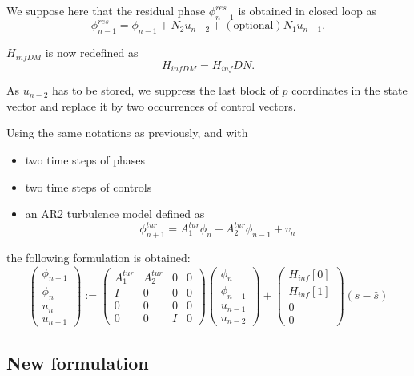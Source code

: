 \documentclass[a4,10pt]{article}
\begin{document}
We suppose here that the residual phase $\phi^{res}_{n-1}$ is obtained in closed loop as
\begin{equation}
\phi^{res}_{n-1}=\phi_{n-1}+N_2u_{n-2} + \mathrm{(optional)} N_1u_{n-1}.
\end{equation}

$H_{infDM}$ is now redefined as
\begin{equation}
H_{infDM}=H_{inf}DN.
\end{equation}

As $u_{n-2}$ has to be stored, we suppress the last block of $p$
coordinates in the state vector and replace it by two occurrences of
control vectors.

Using the same notations as previously, and with
\begin{itemize}
\item two time steps of phases
\item two time steps of controls
\item an AR2 turbulence model defined as
\begin{equation}
\phi_{n+1}^{tur}=A_{1}^{tur}\phi_n+A_2^{tur}\phi_{n-1}+v_n
\end{equation}
\end{itemize}
the following formulation is obtained:
\begin{equation}
\begin{pmatrix}
\phi_{n+1} \\
\phi_n \\
u_n\\
u_{n-1} \end{pmatrix}
:=\begin{pmatrix}A^{tur}_1 &A^{tur}_2&0&0\\
I&0&0&0\\
0&0&0&0\\
0&0&I&0\end{pmatrix}\begin{pmatrix}
\phi_{n}\\
\phi_{n-1}\\
u_{n-1}\\
u_{n-2}\end{pmatrix}+\begin{pmatrix}H_{inf}[0]\\H_{inf}[1]\\0\\0\end{pmatrix}(s-\hat{s})
\label{eq:newform}
\end{equation}

\subsection{New formulation}
\end{document}
